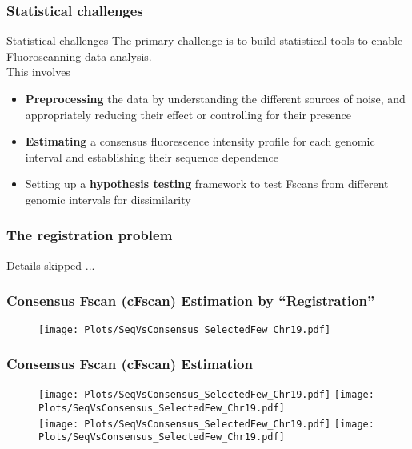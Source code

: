 \documentclass[10pt,dvipsnames,table]{beamer}
\begin{document}
\begin{frame}
\frametitle{Statistical challenges}
\begin{block}{Statistical challenges}
{\Large{The primary challenge is to build statistical tools to enable Fluoroscanning data analysis.}} \\This involves
\begin{itemize}
\item {\bf{Preprocessing}} the data by understanding the different sources of noise, and appropriately reducing their effect or controlling for their presence
\vspace{0.5cm}
\item {\bf{Estimating}} a consensus fluorescence intensity profile for each genomic interval and establishing their sequence dependence
\vspace{0.5cm}
\item Setting up a {\bf{hypothesis testing}} framework to test Fscans from different genomic intervals for dissimilarity
\end{itemize}
\end{block}
\end{frame}

\begin{frame}
\frametitle{The registration problem}

Details skipped ...

\end{frame}

\begin{frame}
\frametitle{Consensus Fscan (cFscan) Estimation by ``Registration''}
\vspace{-0.5cm}
\begin{figure}
\texttt{[image: Plots/SeqVsConsensus\_SelectedFew\_Chr19.pdf]}
\end{figure}
\end{frame}

\begin{frame}
\frametitle{Consensus Fscan (cFscan) Estimation}
\vspace{-0.5cm}
\begin{figure}
\texttt{[image: Plots/SeqVsConsensus\_SelectedFew\_Chr19.pdf]}
\hspace{0.5cm}
\texttt{[image: Plots/SeqVsConsensus\_SelectedFew\_Chr19.pdf]} \\
\texttt{[image: Plots/SeqVsConsensus\_SelectedFew\_Chr19.pdf]}
\hspace{0.5cm}
\texttt{[image: Plots/SeqVsConsensus\_SelectedFew\_Chr19.pdf]}
\end{figure}
\end{frame}
\end{document}
